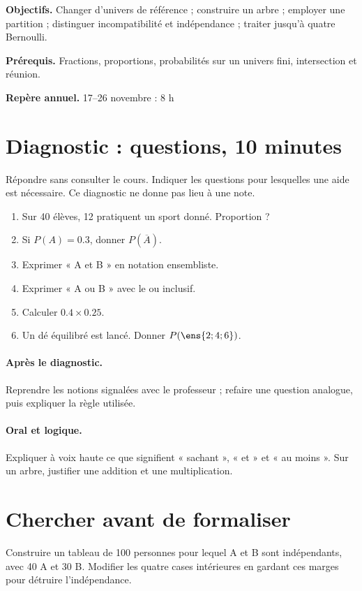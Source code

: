 \label{C05}
\begin{keypoint}
\textbf{Objectifs.} Changer d’univers de référence ; construire un arbre ; employer une partition ; distinguer incompatibilité et indépendance ; traiter jusqu’à quatre Bernoulli.

\textbf{Prérequis.} Fractions, proportions, probabilités sur un univers fini, intersection et réunion.

\textbf{Repère annuel.} 17–26 novembre : 8 h\end{keypoint}
\section*{Diagnostic :  questions, 10 minutes}\label{C05-D}
Répondre sans consulter le cours. Indiquer les questions pour lesquelles une aide est nécessaire. Ce diagnostic ne donne pas lieu à une note.
\begin{enumerate}
\item Sur 40 élèves, 12 pratiquent un sport donné. Proportion ?
\item Si $P(A)=\num{0,3}$, donner $P(\overline A)$.
\item Exprimer « A et B » en notation ensembliste.
\item Exprimer « A ou B » avec le ou inclusif.
\item Calculer $\num{0,4}\times\num{0,25}$.
\item Un dé équilibré est lancé. Donner $P(\ens{2;4;6})$.
\end{enumerate}
\paragraph{Après le diagnostic.} Reprendre les notions signalées avec le professeur ; refaire une question analogue, puis expliquer la règle utilisée.
\paragraph{Oral et logique.} Expliquer à voix haute ce que signifient « sachant », « et » et « au moins ». Sur un arbre, justifier une addition et une multiplication.
\mxnewpage
\section*{Chercher avant de formaliser}\label{C05-RECH}
Construire un tableau de 100 personnes pour lequel A et B sont indépendants, avec 40 A et 30 B. Modifier les quatre cases intérieures en gardant ces marges pour détruire l’indépendance.
